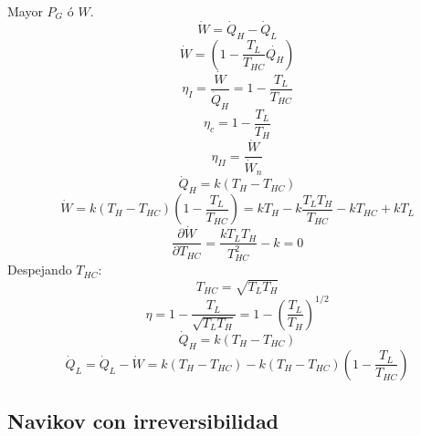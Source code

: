 \documentclass{article}
\begin{document}
Mayor $P_G$ ó $W$.
\begin{equation}
    \dot{W}=\dot{Q}_H-\dot{Q}_L
\end{equation}
\begin{equation}
    \dot{W}=\left(1-\frac{T_L}{T_{HC}}\dot{Q_H}\right)
\end{equation}
\begin{equation}
    \eta_I=\frac{\dot{W}}{\dot{Q}_H}=1-\frac{T_L}{T_{HC}}
\end{equation}
\begin{equation}
    \eta_c=1-\frac{T_L}{T_{H}}
\end{equation}
\begin{equation}
    \eta_{II}=\frac{\dot{W}}{\dot{W}_n}
\end{equation}
\begin{equation}
    \dot{Q}_H=k\left(T_H-T_{HC}\right)
\end{equation}
\begin{equation}
       \dot{W}=k\left(T_H-T_{HC}\right)\left(1-\frac{T_L}{T_{HC}}\right)=kT_H-k\frac{T_L T_H}{T_{HC}}-kT_{HC}+kT_L
\end{equation}
\begin{equation}
    \frac{\partial \dot{W}}{\partial T_{HC}}=\frac{kT_LT_H}{T_{HC}^2}-k=0
\end{equation}
Despejando $T_{HC}$:
\begin{equation}
    T_{HC}=\sqrt{T_LT_H}
\end{equation}
\begin{equation}
    \eta=1-\frac{T_L}{\sqrt{T_LT_H}}=1-\left(\frac{T_L}{T_H}\right)^{1/2}
\end{equation}
\begin{equation}
    \dot{Q}_H=k\left(T_H-T_{HC}\right)
\end{equation}
\begin{equation}
    \dot{Q}_L=\dot{Q}_L-\dot{W}=k\left(T_H-T_{HC}\right)-k\left(T_H-T_{HC}\right)\left(1-\frac{T_L}{T_{HC}}\right)
\end{equation}
\subsection{Navikov con irreversibilidad}
\end{document}
